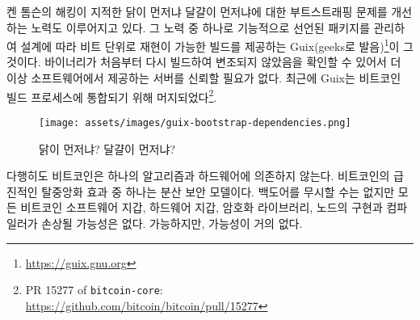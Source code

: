 \begin{comment}
	Various efforts are being made to improve upon the chicken-and-egg problem of
	bootstrapping which Ken Thompson's hack so brilliantly pointed
	out~\cite{web:bootstrapping}. One such effort is
	Guix\footnote{\url{https://guix.gnu.org}} (pronounced \textit{geeks}), which
	uses functionally declared package management leading to bit-for-bit
	reproducible builds by design. The result is that you don't have to trust any
	software-providing servers anymore since you can verify that the served binary
	was not tampered with by rebuilding it from scratch. Recently, a
	pull-request was merged to integrate Guix into the Bitcoin build process.\footnote{See PR 15277 of \texttt{bitcoin-core}: \\ \url{https://github.com/bitcoin/bitcoin/pull/15277}}
\end{comment}
켄 톰슨의 해킹이 지적한 닭이 먼저냐 달걀이 먼저냐에 대한 부트스트래핑 문제를 개선하는 노력도 이루어지고 있다\cite{web:bootstrapping}.
그 노력 중 하나로 기능적으로 선언된 패키지를 관리하여 설계에 따라 비트 단위로 재현이 가능한 빌드를 제공하는 Guix(geeks로 발음)\footnote{\url{https://guix.gnu.org}}이 그것이다.
바이너리가 처음부터 다시 빌드하여 변조되지 않았음을 확인할 수 있어서 더 이상 소프트웨어에서 제공하는 서버를 신뢰할 필요가 없다.
최근에 Guix는 비트코인 빌드 프로세스에 통합되기 위해 머지되었다\footnote{PR 15277 of \texttt{bitcoin-core}: \\ \url{https://github.com/bitcoin/bitcoin/pull/15277}}.

\begin{figure}
	\texttt{[image: assets/images/guix-bootstrap-dependencies.png]}
	\caption{닭이 먼저냐? 달걀이 먼저냐?}
	\label{fig:guix-bootstrap-dependencies}
\end{figure}

\begin{comment}
	Luckily, Bitcoin doesn't rely on a single algorithm or piece of
	hardware. One effect of Bitcoin's radical decentralization is a
	distributed security model. Although the backdoors described above are
	not to be taken lightly, it is unlikely that every software wallet,
	every hardware wallet, every cryptographic library, every node
	implementation, and every compiler of every language is compromised.
	Possible, but highly unlikely.
\end{comment}
다행히도 비트코인은 하나의 알고리즘과 하드웨어에 의존하지 않는다.
비트코인의 급진적인 탈중앙화 효과 중 하나는 분산 보안 모델이다. 
백도어를 무시할 수는 없지만 모든 비트코인 소프트웨어 지갑, 하드웨어 지갑, 
암호화 라이브러리, 노드의 구현과 컴파일러가 손상될 가능성은 없다.
가능하지만, 가능성이 거의 없다.

